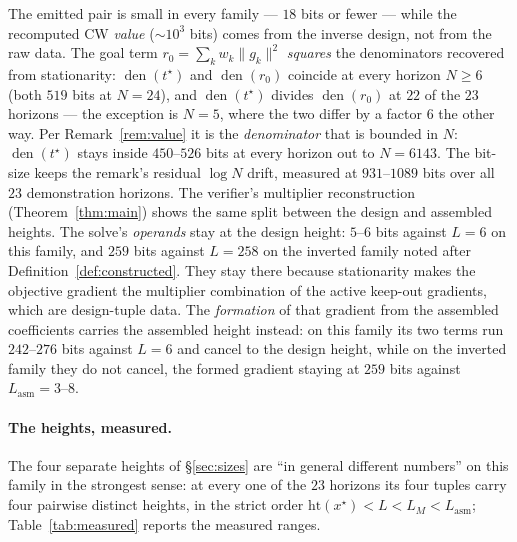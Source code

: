 \documentclass[11pt]{article}
\theoremstyle{definition}
\theoremstyle{remark}
\DeclareMathOperator{\den}{den}
\renewcommand{\_}{\ifdim\fontdimen3\font=0pt\relax\char`\_\else\textunderscore\fi\hspace{0pt}}
\begin{document}
The emitted pair is small in every family --- $18$ bits or fewer --- while the
recomputed CW \emph{value} ($\sim\!10^3$ bits) comes from the inverse design,
not from the raw data. The goal term $r_0=\sum_kw_k\lVert g_k\rVert^2$
\emph{squares} the denominators recovered from stationarity: $\den(t^\star)$
and $\den(r_0)$ coincide at every horizon $N\ge6$ (both $519$ bits at
$N{=}24$), and $\den(t^\star)$ divides $\den(r_0)$ at $22$ of the $23$
horizons --- the exception is $N{=}5$, where the two differ by a factor $6$
the other way. Per Remark~\ref{rem:value} it is the \emph{denominator} that
is bounded in $N$: $\den(t^\star)$ stays inside $450$--$526$ bits at every
horizon out to $N=6143$. The bit-size keeps the remark's residual $\log N$
drift, measured at $931$--$1089$ bits over all $23$ demonstration horizons.
The verifier's multiplier reconstruction
(Theorem~\ref{thm:main}) shows the same split between the design and assembled
heights. The solve's \emph{operands} stay at the design height: $5$--$6$
bits against $L=6$ on this family, and $259$ bits against $L=258$ on the
inverted family noted after Definition~\ref{def:constructed}. They stay
there because stationarity makes the objective gradient the multiplier
combination of the active keep-out gradients, which are design-tuple data.
The \emph{formation} of that gradient
from the assembled coefficients carries the assembled height instead: on this
family its two terms run $242$--$276$ bits against $L=6$ and cancel to the
design height, while on the inverted family they do not cancel, the formed
gradient staying at $259$ bits against $L_{\mathrm{asm}}=3$--$8$.

\paragraph{The heights, measured.} The four separate heights of
\S\ref{sec:sizes} are ``in general different numbers'' on this family in the
strongest sense: at every one of the $23$ horizons its four tuples carry four
pairwise distinct heights, in the strict order
$\mathrm{ht}(x^\star)<L<L_M<L_{\mathrm{asm}}$; Table~\ref{tab:measured}
reports the measured ranges.
\end{document}
